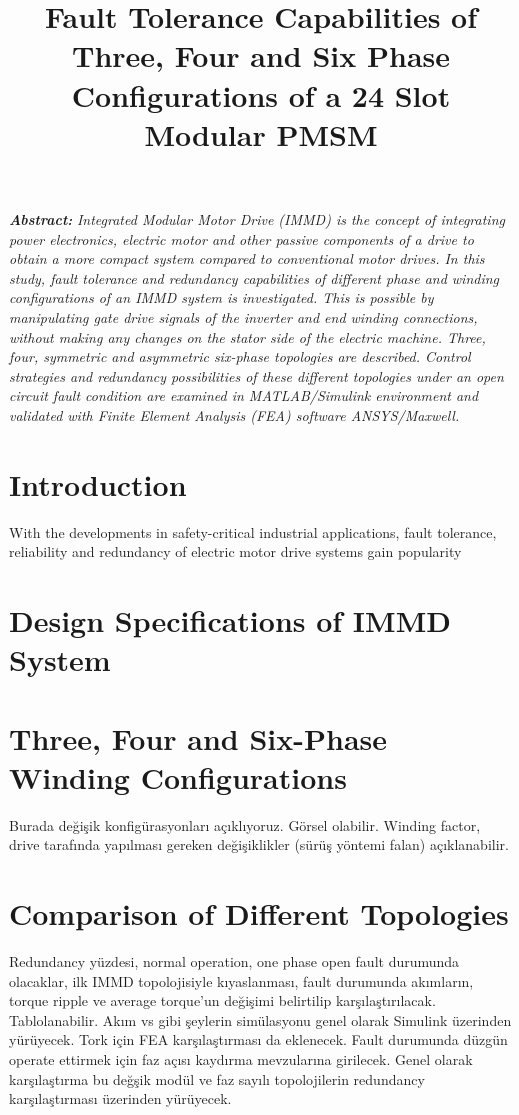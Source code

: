 \documentclass[a4paper,11pt]{article}
\title{\normalsize\textbf{Fault Tolerance Capabilities of Three, Four and Six Phase Configurations of a 24 Slot Modular PMSM}}
\date{}
\begin{document}
\vspace{-45mm}
\maketitle
\vspace{-30mm}
\textit{\normalsize\textbf{Abstract:}}
\textit{Integrated Modular Motor Drive (IMMD) is the concept of integrating power electronics, electric motor and other passive components of a drive to obtain a more compact system compared to conventional motor drives. In this study, fault tolerance and redundancy capabilities of different phase and winding configurations of an IMMD system is investigated. This is possible by manipulating gate drive signals of the inverter and end winding connections, without making any changes on the stator side of the electric machine. Three, four, symmetric and asymmetric six-phase topologies are described. Control strategies and redundancy possibilities of these different topologies under an open circuit fault condition are examined in MATLAB/Simulink environment and validated with Finite Element Analysis (FEA) software ANSYS/Maxwell. }

\section{\normalsize\textbf{Introduction}}
With the developments in safety-critical industrial applications, fault tolerance, reliability and redundancy of electric motor drive systems gain popularity

\section{\normalsize\textbf{Design Specifications of IMMD System}}

 
\section{\normalsize\textbf{Three, Four and Six-Phase Winding Configurations}}
Burada değişik konfigürasyonları açıklıyoruz. Görsel olabilir. Winding factor, drive tarafında yapılması gereken değişiklikler (sürüş yöntemi falan) açıklanabilir.

\section{\normalsize\textbf{Comparison of Different Topologies}}
Redundancy yüzdesi, normal operation, one phase open fault durumunda olacaklar, ilk IMMD topolojisiyle kıyaslanması, fault durumunda akımların, torque ripple ve average torque'un değişimi belirtilip karşılaştırılacak. Tablolanabilir. Akım vs gibi şeylerin simülasyonu genel olarak Simulink üzerinden yürüyecek. Tork için FEA karşılaştırması da eklenecek. Fault durumunda düzgün operate ettirmek için faz açısı kaydırma mevzularına girilecek. Genel olarak karşılaştırma bu değşik modül ve faz sayılı topolojilerin redundancy karşılaştırması üzerinden yürüyecek. 
\end{document}
